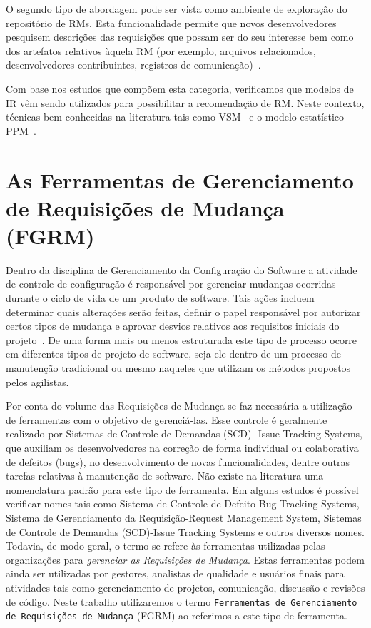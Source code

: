 O segundo tipo de abordagem pode ser vista como ambiente de exploração do
repositório de RMs.  Esta funcionalidade permite que novos desenvolvedores
pesquisem descrições das requisições que possam ser do seu interesse bem como
dos artefatos relativos àquela RM (por exemplo, arquivos relacionados,
desenvolvedores contribuintes, registros de comunicação)~\cite{Wang2011bug}.

Com base nos estudos que compõem esta categoria, verificamos que modelos de IR
vêm sendo utilizados para possibilitar a recomendação de RM\@. Neste contexto,
técnicas bem conhecidas na literatura tais como VSM~\cite{Wang2011bug} e o
modelo estatístico PPM~\cite{malheiros2012source}.

\section{As Ferramentas de Gerenciamento de Requisições de Mudança (FGRM)}
\label{sec:ferramentas_de_gerenciamento_requisicoes_de_mudanca}

Dentro da disciplina de Gerenciamento da Configuração do Software a atividade de
controle de configuração é responsável por gerenciar mudanças ocorridas durante
o ciclo de vida de um produto de software. Tais ações incluem determinar quais
alterações serão feitas, definir o papel responsável por autorizar certos tipos
de mudança e aprovar desvios relativos aos requisitos iniciais do
projeto~\cite{4425813}. De uma forma mais ou menos estruturada este tipo de
processo ocorre em diferentes tipos de projeto de software, seja ele dentro de
um processo de manutenção tradicional ou mesmo naqueles que utilizam os métodos
propostos pelos agilistas.

Por conta do volume das Requisições de Mudança se faz necessária a utilização de
ferramentas com o objetivo de gerenciá-las. Esse controle é geralmente realizado
por Sistemas de Controle de Demandas (SCD)- Issue Tracking Systems, que auxiliam
os desenvolvedores na correção de forma individual ou colaborativa de defeitos
(bugs), no desenvolvimento de novas funcionalidades, dentre outras tarefas
relativas à manutenção de software. Não existe na literatura uma nomenclatura
padrão para este tipo de ferramenta. Em alguns estudos é possível verificar
nomes tais como Sistema de Controle de Defeito\@-\@ Bug Tracking Systems,
Sistema de Gerenciamento da Requisição\@-\@ Request Management System, Sistemas
de Controle de Demandas (SCD)\@-\@ Issue Tracking Systems e outros diversos
nomes.  Todavia, de modo geral, o termo se refere às ferramentas utilizadas
pelas organizações para \textit{gerenciar as Requisições de Mudança}. Estas
ferramentas podem ainda ser utilizadas por gestores, analistas de qualidade e
usuários finais para atividades tais como gerenciamento de projetos,
comunicação, discussão e revisões de código. Neste trabalho utilizaremos o termo
\texttt{Ferramentas de Gerenciamento de Requisições de Mudança} (FGRM) ao
referimos a este tipo de ferramenta.

